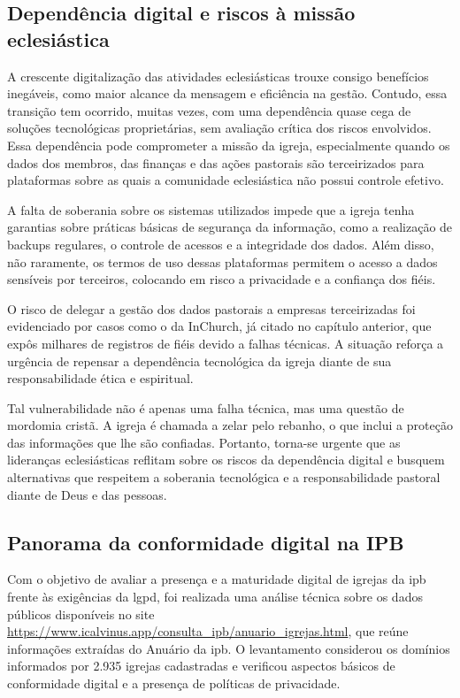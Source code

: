 \subsection{Dependência digital e riscos à missão eclesiástica}

A crescente digitalização das atividades eclesiásticas trouxe consigo benefícios inegáveis, como maior alcance da mensagem e eficiência na gestão. Contudo, essa transição tem ocorrido, muitas vezes, com uma dependência quase cega de soluções tecnológicas proprietárias, sem avaliação crítica dos riscos envolvidos. Essa dependência pode comprometer a missão da igreja, especialmente quando os dados dos membros, das finanças e das ações pastorais são terceirizados para plataformas sobre as quais a comunidade eclesiástica não possui controle efetivo.

A falta de soberania sobre os sistemas utilizados impede que a igreja tenha garantias sobre práticas básicas de segurança da informação, como a realização de backups regulares, o controle de acessos e a integridade dos dados. Além disso, não raramente, os termos de uso dessas plataformas permitem o acesso a dados sensíveis por terceiros, colocando em risco a privacidade e a confiança dos fiéis.

O risco de delegar a gestão dos dados pastorais a empresas terceirizadas foi evidenciado por casos como o da InChurch\cite{almeida_inchurch_2024}, já citado no capítulo anterior, que expôs milhares de registros de fiéis devido a falhas técnicas. A situação reforça a urgência de repensar a dependência tecnológica da igreja diante de sua responsabilidade ética e espiritual.

Tal vulnerabilidade não é apenas uma falha técnica, mas uma questão de mordomia cristã. A igreja é chamada a zelar pelo rebanho, o que inclui a proteção das informações que lhe são confiadas. Portanto, torna-se urgente que as lideranças eclesiásticas reflitam sobre os riscos da dependência digital e busquem alternativas que respeitem a soberania tecnológica e a responsabilidade pastoral diante de Deus e das pessoas.

\subsection{Panorama da conformidade digital na IPB}

Com o objetivo de avaliar a presença e a maturidade digital de igrejas da \gls{ipb} frente às exigências da \gls{lgpd}, foi realizada uma análise técnica sobre os dados públicos disponíveis no site \url{https://www.icalvinus.app/consulta_ipb/anuario_igrejas.html}, que reúne informações extraídas do Anuário da \gls{ipb}. O levantamento considerou os domínios informados por 2.935 igrejas cadastradas e verificou aspectos básicos de conformidade digital e a presença de políticas de privacidade.

